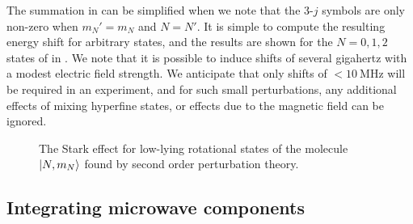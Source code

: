 The summation in  can be simplified when we note that
the 3-$j$ symbols are only non-zero when $m_N' = m_N$ and $N=N'$. It is simple
to compute the resulting energy shift for arbitrary states, and the results are
shown for the $N=0, 1, 2$ states of \CaF{} in . We note
that it is possible to induce shifts of several gigahertz with a modest
electric field strength. We anticipate that only shifts of
$<\SI{10}{\mega\hertz}$ will be required in an experiment, and for such small
perturbations, any additional effects of mixing hyperfine states, or effects
due to the magnetic field can be ignored.

\begin{figure}[h]
  \centering
  \caption[The Stark effect in \CaF{}]{
    The Stark effect for low-lying rotational states of the \CaF{} molecule $\ket{N,
    m_N}$ found by second order perturbation theory.}
  \label{mws:fig:stark}
\end{figure}

\subsection{Integrating microwave components}
\label{mws:components}

